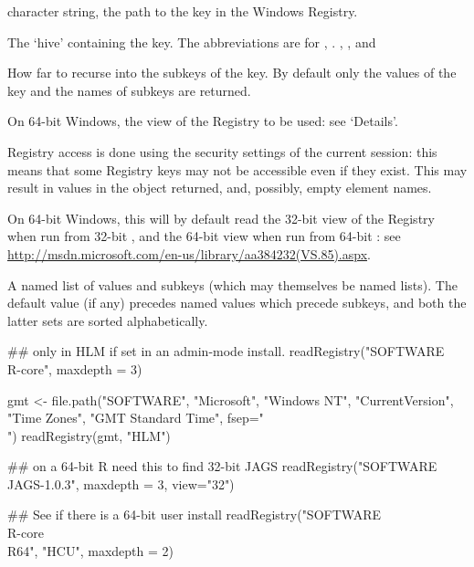 %
\begin{Arguments}
\begin{ldescription}
\item[\code{key}] character string, the path to the key in the Windows Registry.
\item[\code{hive}] The `hive' containing the key.  The abbreviations
are for ,
. ,
,  and
\item[\code{maxdepth}] How far to recurse into the subkeys of the key.  By
default only the values of the key and the names of subkeys are
returned.
\item[\code{view}] On 64-bit Windows, the view of the Registry to be used:
see `Details'.
\end{ldescription}
\end{Arguments}
%
\begin{Details}\relax
Registry access is done using the security settings of the current \R{}
session: this means that some Registry keys may not be accessible even
if they exist.  This may result in  values in the object
returned, and, possibly, empty element names.

On 64-bit Windows, this will by default read the 32-bit view of the
Registry when run from 32-bit \R{}, and the 64-bit view when run from
64-bit \R{}: see
\url{http://msdn.microsoft.com/en-us/library/aa384232(VS.85).aspx}.
\end{Details}
%
\begin{Value}
A named list of values and subkeys (which may themselves be named
lists).  The default value (if any) precedes named values which
precede subkeys, and both the latter sets are sorted alphabetically.
\end{Value}
%
\begin{Examples}
\begin{ExampleCode}

## only in HLM if set in an admin-mode install.
readRegistry("SOFTWARE\\R-core", maxdepth = 3)

gmt <- file.path("SOFTWARE", "Microsoft", "Windows NT",
                 "CurrentVersion", "Time Zones",
                 "GMT Standard Time", fsep="\\")
readRegistry(gmt, "HLM")

## on a 64-bit R need this to find 32-bit JAGS
readRegistry("SOFTWARE\\JAGS-1.0.3", maxdepth = 3, view="32")

## See if there is a 64-bit user install
readRegistry("SOFTWARE\\R-core\\R64", "HCU", maxdepth = 2)
\end{ExampleCode}
\end{Examples}
